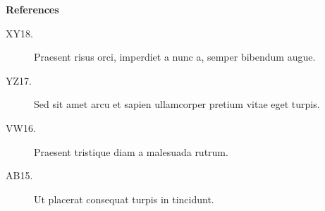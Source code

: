\documentclass{modernposter}
\begin{document}
\begin{postercolumn}
{      {\bf References}
      \begin{description}
        \item[XY18.] Praesent risus orci, imperdiet a nunc a, semper bibendum augue. 
        \item[YZ17.] Sed sit amet arcu et sapien ullamcorper pretium vitae eget turpis.
        \item[VW16.] Praesent tristique diam a malesuada rutrum. 
        \item[AB15.] Ut placerat consequat turpis in tincidunt.
      \end{description}
    }
\end{postercolumn}
 
\end{document}
